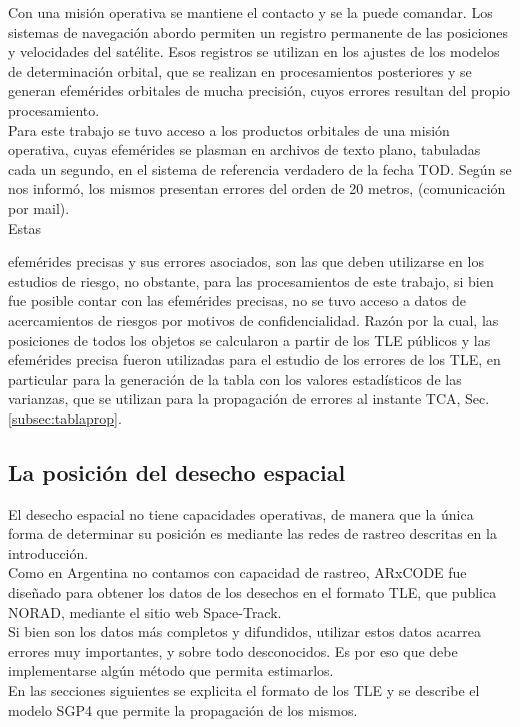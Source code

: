 Con una misi\'on operativa se mantiene el contacto y se la puede comandar. Los sistemas de navegaci\'on abordo permiten un registro permanente de las posiciones y velocidades del sat\'elite. Esos registros se utilizan en los ajustes de los modelos de determinaci\'on orbital, que se realizan en procesamientos posteriores y se generan efem\'erides orbitales de mucha precisi\'on, cuyos errores resultan del propio procesamiento.\\
Para este trabajo se tuvo acceso a los productos orbitales de una misi\'on operativa, cuyas efem\'erides se plasman en archivos de texto plano, tabuladas cada un segundo, en el sistema de referencia verdadero de la fecha TOD. Seg\'un se nos inform\'o, los mismos presentan errores del orden de  20 metros, (comunicaci\'on por mail).\\
Estas {efem\'erides precisas y sus errores asociados, son las que deben utilizarse en los estudios de riesgo, no obstante, para las procesamientos de este trabajo, si bien fue posible contar con las efem\'erides precisas, no se tuvo acceso a datos de acercamientos de riesgos por motivos de confidencialidad. Raz\'on por la cual, las posiciones de todos los objetos se calcularon a partir de los TLE p\'ublicos y las efem\'erides precisa fueron utilizadas para el estudio de los errores de los TLE, en particular para la generaci\'on de la tabla con los valores estad\'isticos de las varianzas, que se utilizan para la propagaci\'on de errores al instante TCA, Sec. \ref{subsec:tablaprop}. \\

\subsection{La posici\'on del desecho espacial}
El desecho espacial no tiene capacidades operativas, de manera que la \'unica forma de determinar su posici\'on es mediante las redes de rastreo descritas en la introducci\'on.\\
Como en Argentina no contamos con capacidad de rastreo, ARxCODE fue dise\~nado para obtener los datos de los desechos en el formato TLE, que publica NORAD, mediante el sitio web Space-Track.\\
Si bien son los datos m\'as completos y difundidos, utilizar estos datos acarrea errores muy importantes, y sobre todo desconocidos. Es por eso que debe implementarse alg\'un m\'etodo que permita estimarlos.\\

En las secciones siguientes se explicita el formato de los TLE y se describe el modelo SGP4 que permite la propagaci\'on de los mismos.\\

}
